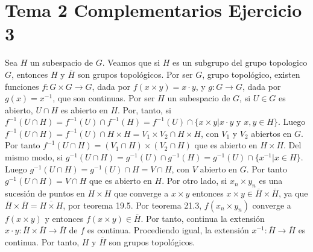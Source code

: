 \documentclass{article}
\begin{document}
\section{Tema 2 Complementarios Ejercicio 3}
Sea $H$ un subespacio de $G$. Veamos que si $H$ es un subgrupo del grupo topologico $G$, entonces $H$ y $\overline{H}$ son grupos topológicos. Por ser $G$, grupo topológico, existen funciones $f : G\times G\rightarrow G$, dada por $f(x\times y)=x\cdot y$, y $g: G\rightarrow G$, dada por $g(x)=x^{-1}$, que son continuas. Por ser $H$ un subespacio de $G$, si $U\in G$ es abierto, $U\cap H$ es abierto en $H$. Por, tanto, si $f^{-1}(U\cap H)= f^{-1}(U)\cap f^{-1}(H)= f^{-1}(U)\cap \{x\times y |x\cdot y \text{ y } x,y\in H\}$. Luego $f^{-1}(U\cap H)=f^{-1}(U)\cap H\times H=V_1\times V_2\cap H\times H$, con $V_1$ y $V_2$ abiertos en $G$. Por tanto $f^{-1}(U\cap H)= (V_1\cap H)\times (V_2 \cap H)$ que es abierto en $H\times H$. Del mismo modo, si $g^{-1}(U\cap H)= g^{-1}(U)\cap g^{-1}(H)= g^{-1}(U)\cap \{x^{-1} | x\in H\}$. Luego $g^{-1}(U\cap H)=g^{-1}(U)\cap H=V\cap H$, con $V$ abierto en $G$. Por tanto $g^{-1}(U\cap H)= V\cap H$ que es abierto en $H$. Por otro lado, si $x_n\times y_n$ es una sucesión de puntos en $H\times H$ que converge a $x\times y$ entonces $ x\times y \in \overline{H}\times \overline{H}$, ya que $\overline{H}\times \overline{H}=\overline{H\times H}$, por teorema 19.5. Por teorema 21.3, $f(x_n\times y_n)$ converge a $f(x\times y)$ y entonces $f(x\times y)\in \overline{H}$. Por tanto, continua la extensión $x\cdot y: \overline{H}\times \overline{H}\rightarrow \overline{H}$ de $f$ es continua. Procediendo igual, la extensión $x^{-1}:\overline{H}\rightarrow \overline{H}$ es continua. Por tanto, $H$ y $\overline{H}$ son grupos topológicos.
\end{document}
